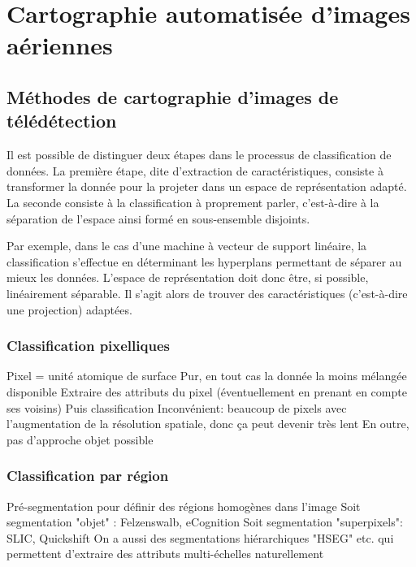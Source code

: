 \chapter{Cartographie automatisée d'images aériennes}
	\citationChap{}{}
	\minitoc
	\newpage


\section{Méthodes de cartographie d'images de télédétection}

Il est possible de distinguer deux étapes dans le processus de classification de données. La première étape, dite d'extraction de caractéristiques, consiste à transformer la donnée pour la projeter dans un espace de représentation adapté. La seconde consiste à la classification à proprement parler, c'est-à-dire à la séparation de l'espace ainsi formé en sous-ensemble disjoints.

Par exemple, dans le cas d'une machine à vecteur de support linéaire, la classification s'effectue en déterminant les hyperplans permettant de séparer au mieux les données. L'espace de représentation doit donc être, si possible, linéairement séparable. Il s'agit alors de trouver des caractéristiques (c'est-à-dire une projection) adaptées.

\subsection{Classification pixelliques}

Pixel = unité atomique de surface
Pur, en tout cas la donnée la moins mélangée disponible
Extraire des attributs du pixel (éventuellement en prenant en compte ses voisins)
Puis classification
Inconvénient: beaucoup de pixels avec l'augmentation de la résolution spatiale, donc ça peut devenir très lent
En outre, pas d'approche objet possible

\subsection{Classification par région}

Pré-segmentation pour définir des régions homogènes dans l'image
Soit segmentation "objet" : Felzenswalb, eCognition
Soit segmentation "superpixels": SLIC, Quickshift
On a aussi des segmentations hiérarchiques "HSEG" etc. qui permettent d'extraire des attributs multi-échelles naturellement

